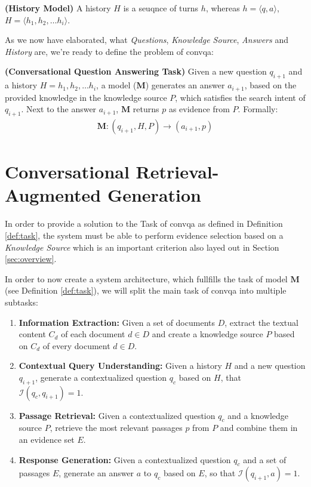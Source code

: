 \begin{definition}
    \textbf{(History Model)} A history $H$ is a seuqnce of turns $h$, whereas $h = \langle q,a\rangle$, $H = \langle h_1, h_2, \dots h_i\rangle$.
    \label{def:history_model}
\end{definition}

As we now have elaborated, what \textit{Questions}, \textit{Knowledge Source}, \textit{Answers} and \textit{History} are, we're ready to define the problem of \gls{convqa}:

\begin{definition}
    \textbf{(Conversational Question Answering Task)} Given a new question $q_{i+1}$ and a history $H = {h_1, h_2, \dots h_i}$, a model ($\mathbf{M}$) generates an answer $a_{i+1}$, based on the provided knowledge in the knowledge source $P$, which satisfies the search intent of $q_{i+1}$. Next to the answer $a_{i+1}$, $\mathbf{M}$ returns $p$ as evidence from $P$. Formally:
    \begin{align*}
        \mathbf{M}: (q_{i+1}, H, P) \rightarrow (a_{i+1}, p)
    \end{align*}
    \label{def:task}
\end{definition}

\section{Conversational Retrieval-Augmented Generation}
\label{sec:conrag}

In order to provide a solution to the Task of \gls{convqa} as defined in Definition \ref{def:task}, the system must be able to perform evidence selection based on a \textit{Knowledge Source} which is an important criterion also layed out in Section \ref{sec:overview}. 

In order to now create a system architecture, which fullfills the task of model $\mathbf{M}$ (see Definition \ref{def:task}), we will split the main task of \gls{convqa} into multiple subtasks:

\begin{enumerate}
    \item \textbf{Information Extraction:} Given a set of documents $D$, extract the textual content $C_d$ of each document $d \in D$ and create a knowledge source $P$ based on $C_d$ of every document $d \in D$.
    \item \textbf{Contextual Query Understanding:} Given a history $H$ and a new question $q_{i+1}$, generate a contextualized question $q_c$ based on $H$, that $\mathcal{I}(q_c,q_{i+1}) = 1$.
    \item \textbf{Passage Retrieval:} Given a contextualized question $q_c$ and a knowledge source $P$, retrieve the most relevant passages $p$ from $P$ and combine them in an evidence set $E$.
    \item \textbf{Response Generation:} Given a contextualized question $q_c$ and a set of passages $E$, generate an answer $a$ to $q_c$ based on $E$, so that $\mathcal{I}(q_{i+1},a) = 1$.
\end{enumerate}

